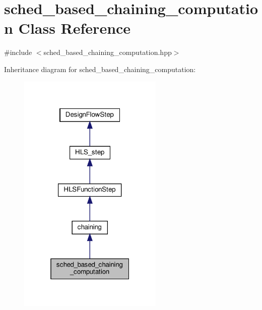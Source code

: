 \hypertarget{classsched__based__chaining__computation}{}\section{sched\+\_\+based\+\_\+chaining\+\_\+computation Class Reference}
\label{classsched__based__chaining__computation}


{\ttfamily \#include $<$sched\+\_\+based\+\_\+chaining\+\_\+computation.\+hpp$>$}



Inheritance diagram for sched\+\_\+based\+\_\+chaining\+\_\+computation\+:
\nopagebreak
\begin{figure}[H]
\begin{center}
\leavevmode
\includegraphics[width=196pt]{db/d5a/classsched__based__chaining__computation__inherit__graph}
\end{center}
\end{figure}


